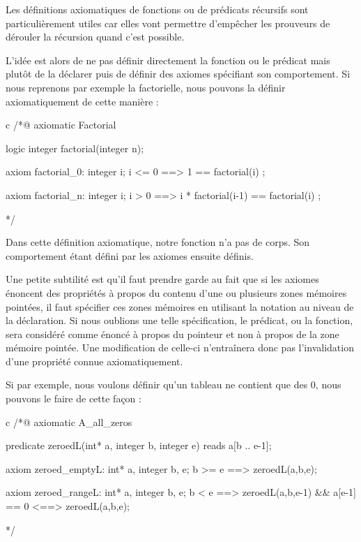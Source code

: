 \documentclass[middle]{zmdocument}
\begin{document}
Les définitions axiomatiques de fonctions ou de prédicats récursifs sont 
particulièrement utiles car elles vont permettre d'empêcher les prouveurs de 
dérouler la récursion quand c'est possible.



L'idée est alors de ne pas définir directement la fonction ou le prédicat mais 
plutôt de la déclarer puis de définir des axiomes spécifiant son comportement.
Si nous reprenons par exemple la factorielle, nous pouvons la définir 
axiomatiquement de cette manière :



\begin{CodeBlock}{c}
/*@
  axiomatic Factorial{
    logic integer factorial(integer n);
    
    axiom factorial_0:
      \forall integer i; i <= 0 ==> 1 == factorial(i) ;

    axiom factorial_n:
      \forall integer i; i > 0 ==> i * factorial(i-1) == factorial(i) ;
  }
*/
\end{CodeBlock}



Dans cette définition axiomatique, notre fonction n'a pas de corps. Son 
comportement étant défini par les axiomes ensuite définis.



Une petite subtilité
est qu'il faut prendre garde au fait que si les axiomes énoncent des propriétés
à propos du contenu d'une ou plusieurs zones mémoires pointées, il faut 
spécifier ces zones mémoires en utilisant la notation  au niveau de
la déclaration. Si nous oublions une telle spécification, le prédicat, ou la 
fonction, sera considéré comme énoncé à propos du pointeur et non à propos de la
zone mémoire pointée. Une modification de celle-ci n'entraînera donc pas 
l'invalidation d'une propriété connue axiomatiquement.



Si par exemple, nous voulons définir qu'un tableau ne contient que des 0, nous
pouvons le faire de cette façon :



\begin{CodeBlock}{c}
/*@
  axiomatic A_all_zeros{
    predicate zeroed{L}(int* a, integer b, integer e) reads a[b .. e-1];

    axiom zeroed_empty{L}:
      \forall int* a, integer b, e; b >= e ==> zeroed{L}(a,b,e);
      
    axiom zeroed_range{L}:
      \forall int* a, integer b, e; b < e ==>
        zeroed{L}(a,b,e-1) && a[e-1] == 0 <==> zeroed{L}(a,b,e);
  }
*/
\end{CodeBlock}
\end{document}

